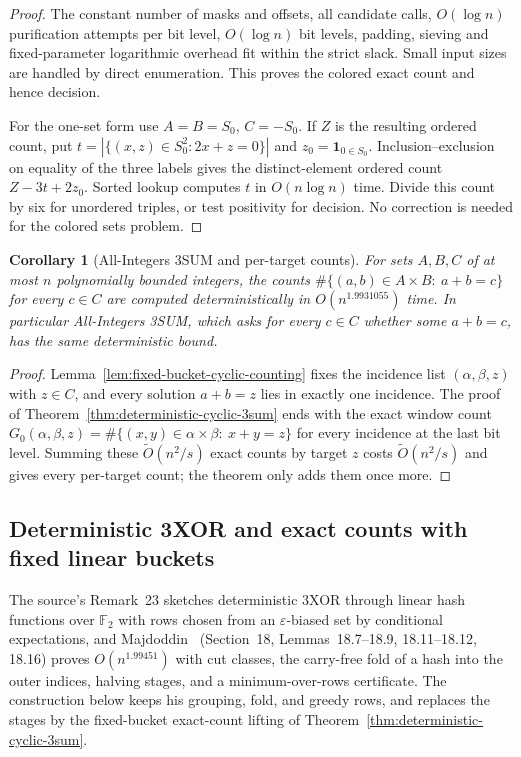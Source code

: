\documentclass[11pt]{article}
\newtheorem{corollary}[theorem]{Corollary}
\newcommand{\softO}{\widetilde O}
\begin{document}
\begin{proof}
The constant number of masks and offsets, all candidate calls,
$O(\log n)$ purification attempts per bit level, $O(\log n)$ bit
levels, padding, sieving and fixed-parameter logarithmic overhead fit
within the strict slack.  Small input sizes are handled by direct
enumeration.  This proves the colored exact count and hence decision.

For the one-set form use $A=B=S_0$, $C=-S_0$.  If $Z$ is the resulting
ordered count, put
$t=|\{(x,z)\in S_0^2:2x+z=0\}|$ and
$z_0=\mathbf1_{0\in S_0}$.  Inclusion--exclusion on equality of the
three labels gives the distinct-element ordered count
$Z-3t+2z_0$.  Sorted lookup computes $t$ in $O(n\log n)$ time.
Divide this count by six for unordered triples, or test positivity
for decision.  No correction is needed for the colored sets problem.
\end{proof}

\begin{corollary}[All-Integers 3SUM and per-target counts]
\label{cor:all-integers-3sum}
For sets $A,B,C$ of at most $n$ polynomially bounded integers, the counts
$\#\{(a,b)\in A\times B:\ a+b=c\}$ for every $c\in C$ are computed
deterministically in $O(n^{1.9931055})$ time. In particular All-Integers
3SUM, which asks for every $c\in C$ whether some $a+b=c$, has the same
deterministic bound.
\end{corollary}
\begin{proof}
Lemma~\ref{lem:fixed-bucket-cyclic-counting} fixes the incidence list
$(\alpha,\beta,z)$ with $z\in C$, and every solution $a+b=z$ lies in
exactly one incidence. The proof of
Theorem~\ref{thm:deterministic-cyclic-3sum} ends with the exact window
count $G_0(\alpha,\beta,z)=\#\{(x,y)\in\alpha\times\beta:\ x+y=z\}$ for
every incidence at the last bit level. Summing these $\softO(n^2/s)$
exact counts by target $z$ costs $\softO(n^2/s)$ and gives every
per-target count; the theorem only adds them once more.
\end{proof}

\subsection{Deterministic 3XOR and exact counts with fixed linear buckets}
\label{sec:deterministic-3xor}
The source's Remark~23 sketches deterministic 3XOR through linear hash
functions over $\mathbb F_2$ with rows chosen from an $\varepsilon$-biased set
by conditional expectations, and Majdoddin~\cite{M26} (Section~18,
Lemmas~18.7--18.9, 18.11--18.12, 18.16) proves $O(n^{1.99451})$ with cut
classes, the carry-free fold of a hash into the outer indices, halving
stages, and a minimum-over-rows certificate. The construction below keeps
his grouping, fold, and greedy rows, and replaces the stages by the
fixed-bucket exact-count lifting of Theorem~\ref{thm:deterministic-cyclic-3sum}.
\end{document}
